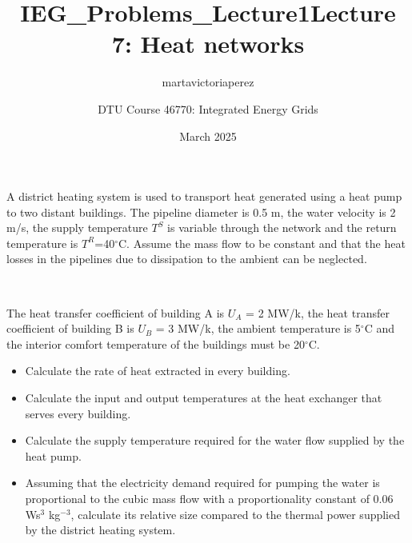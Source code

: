 \documentclass[10pt]{article}
\title{IEG_Problems_Lecture1}
\author{martavictoriaperez }
\date{March 2025}
\newenvironment{problem}[2][Problem]{\begin{trivlist}
\item[\hskip \labelsep {\bfseries #1}\hskip \labelsep {\bfseries #2.}]}{\end{trivlist}}
\begin{document}
 
\title{\textbf{Lecture 7: Heat networks}}
\author{
DTU Course 46770: Integrated Energy Grids }
\maketitle

\begin{problem}{7.1}

A district heating system is used to transport heat generated using a heat pump to two distant buildings. The pipeline diameter is 0.5 m, the water velocity is 2 m/s, the supply temperature $T^S$ is variable through the network and the return temperature is $T^R$=40$^{\circ}$C. Assume the mass flow to be constant and that the heat losses in the pipelines due to dissipation to the ambient can be neglected.

\

The heat transfer coefficient of building A is $U_A$ = 2 MW/k, the heat transfer coefficient of building B is $U_B$ = 3 MW/k, the ambient temperature is 5$^{\circ}$C and the interior comfort temperature of the buildings must be 20$^{\circ}$C.
\begin{itemize}

\item[a)] Calculate the rate of heat extracted in every building.

\item[b)]  Calculate the input and output temperatures at the heat exchanger that serves every building.

\item[c)]  Calculate the supply temperature required for the water flow supplied by the heat pump.

\item[d)]  Assuming that the electricity demand required for pumping the water is proportional to the cubic mass flow with a proportionality constant of 0.06 Ws$^3$ kg$^{-3}$, calculate its relative size compared to the thermal power supplied by the district heating system.

\end{itemize}


\end{problem}

\
\end{document}
